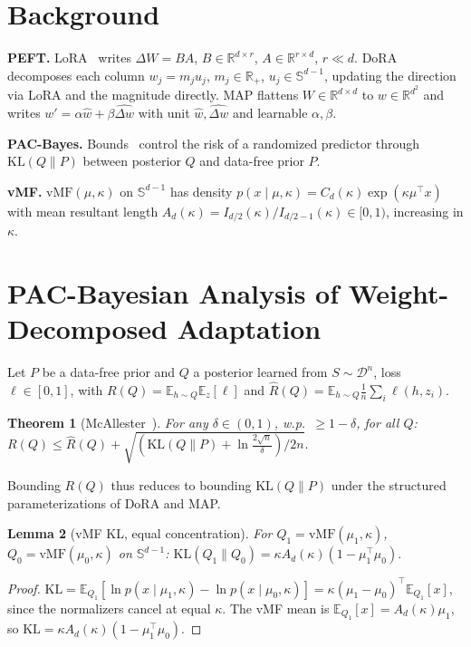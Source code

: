 \documentclass[11pt]{article}
\newtheorem{theorem}{Theorem}[section]
\newtheorem{lemma}[theorem]{Lemma}
\newcommand{\KL}{\mathrm{KL}}
\newcommand{\vMF}{\mathrm{vMF}}
\newcommand{\Ad}{A_d}
\newcommand{\Sd}{\mathbb{S}^{d-1}}
\newcommand{\E}{\mathbb{E}}
\newcommand{\R}{\mathbb{R}}
\begin{document}
\section{Background}
\textbf{PEFT.} LoRA~\cite{hu2021lora} writes $\Delta W=BA$, $B\in\R^{d\times r}$,
$A\in\R^{r\times d}$, $r\ll d$. DoRA decomposes each column $w_j=m_j u_j$,
$m_j\in\R_+$, $u_j\in\Sd$, updating the direction via LoRA and the magnitude directly.
MAP flattens $W\in\R^{d\times d}$ to $w\in\R^{d^2}$ and writes
$w'=\alpha\hat w+\beta\widehat{\Delta w}$ with unit $\hat w,\widehat{\Delta w}$ and
learnable $\alpha,\beta$.

\textbf{PAC-Bayes.} Bounds~\cite{mcallester1999pac} control the risk of a randomized
predictor through $\KL(Q\|P)$ between posterior $Q$ and data-free prior $P$.

\textbf{vMF.} $\vMF(\mu,\kappa)$ on $\Sd$ has density
$p(x\mid\mu,\kappa)=C_d(\kappa)\exp(\kappa\mu^\top x)$ with mean resultant length
$\Ad(\kappa)=I_{d/2}(\kappa)/I_{d/2-1}(\kappa)\in[0,1)$, increasing in $\kappa$.

\section{PAC-Bayesian Analysis of Weight-Decomposed Adaptation}
\label{sec:analysis}

Let $P$ be a data-free prior and $Q$ a posterior learned from $S\sim\mathcal{D}^n$,
loss $\ell\in[0,1]$, with $R(Q)=\E_{h\sim Q}\E_z[\ell]$ and
$\hat R(Q)=\E_{h\sim Q}\frac1n\sum_i\ell(h,z_i)$.

\begin{theorem}[McAllester~\cite{mcallester1999pac}]\label{thm:mcallester}
For any $\delta\in(0,1)$, w.p.\ $\ge1-\delta$, for all $Q$:
$R(Q)\le\hat R(Q)+\sqrt{(\KL(Q\|P)+\ln\tfrac{2\sqrt n}{\delta})/2n}.$
\end{theorem}
\noindent Bounding $R(Q)$ thus reduces to bounding $\KL(Q\|P)$ under the structured
parameterizations of DoRA and MAP.

\begin{lemma}[vMF KL, equal concentration]\label{lem:vmf_kl}
For $Q_1=\vMF(\mu_1,\kappa)$, $Q_0=\vMF(\mu_0,\kappa)$ on $\Sd$:
$\KL(Q_1\|Q_0)=\kappa \Ad(\kappa)(1-\mu_1^\top\mu_0).$
\end{lemma}
\begin{proof}
$\KL=\E_{Q_1}[\ln p(x\mid\mu_1,\kappa)-\ln p(x\mid\mu_0,\kappa)]=\kappa(\mu_1-\mu_0)^\top\E_{Q_1}[x]$,
since the normalizers cancel at equal $\kappa$. The vMF mean is
$\E_{Q_1}[x]=\Ad(\kappa)\mu_1$, so
$\KL=\kappa \Ad(\kappa)(1-\mu_1^\top\mu_0)$.
\end{proof}
\end{document}
